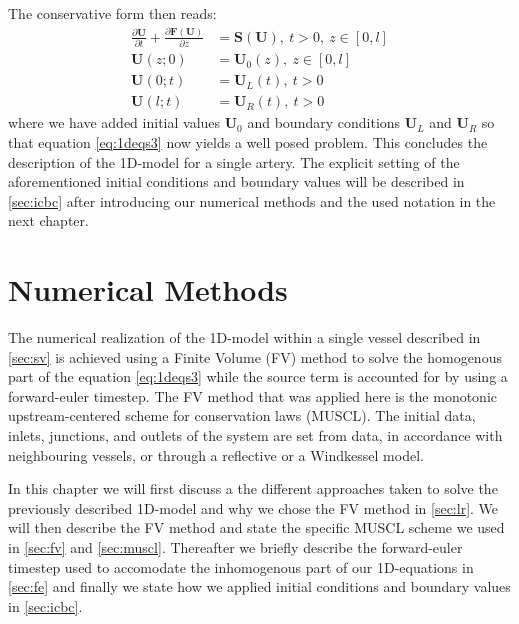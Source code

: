 \documentclass[a4paper, oneside]{discothesis}
\begin{document}
The conservative form then reads:
\begin{equation}
	\begin{aligned}
		\frac{\partial \mathbf{U}}{\partial t} + \frac{\partial \mathbf{F} \left( \mathbf{U} \right)}{\partial z} &= \mathbf{S} \left( \mathbf{U} \right), \ t>0, \ z \in \left[ 0,l \right] \\
		\mathbf{U} \left( z;0 \right) &= \mathbf{U}_0 \left( z \right), \ z \in \left[ 0,l \right] \\
	\mathbf{U} \left( 0;t \right) &= \mathbf{U}_L \left( t \right), \ t>0\\
\mathbf{U} \left( l;t \right) &= \mathbf{U}_R \left( t \right), \ t>0
	\end{aligned} \label{eq:1deqs3}
\end{equation}
where we have added initial values $\mathbf{U}_0$ and boundary conditions $\mathbf{U}_L$ and $\mathbf{U}_R$ so that equation \ref{eq:1deqs3} now yields a well posed problem.\cite{formaggia2010cardiovascular}
This concludes the description of the 1D-model for a single artery.
The explicit setting of the aforementioned initial conditions and boundary values will be described in \autoref{sec:icbc} after introducing our numerical methods and the used notation in the next chapter.





\chapter{Numerical Methods} \label{chap:nm}
The numerical realization of the 1D-model within a single vessel described in \autoref{sec:sv} is achieved using a Finite Volume (FV) method to solve the homogenous part of the equation \autoref{eq:1deqs3} while the source term is accounted for by using a forward-euler timestep. 
The FV method that was applied here is the monotonic upstream-centered scheme for conservation laws (MUSCL).
The initial data, inlets, junctions, and outlets of the system are set from data, in accordance with neighbouring vessels, or through a reflective or a Windkessel model.

In this chapter we will first discuss a the different approaches taken to solve the previously described 1D-model and why we chose the FV method in \autoref{sec:lr}.
We will then describe the FV method and state the specific MUSCL scheme we used in \autoref{sec:fv} and \autoref{sec:muscl}.
Thereafter we briefly describe the forward-euler timestep used to accomodate the inhomogenous part of our 1D-equations in \autoref{sec:fe} and finally we state how we applied initial conditions and boundary values in \autoref{sec:icbc}.
\end{document}
